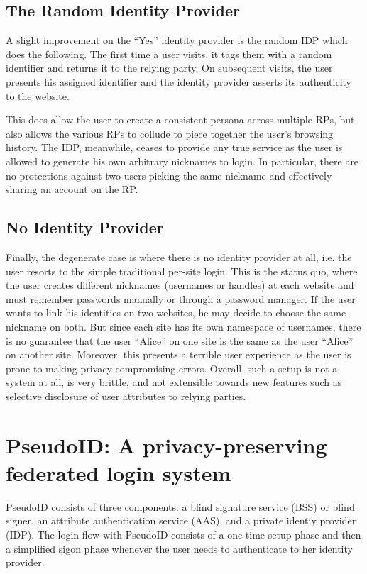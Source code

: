 \documentclass{llncs}
\begin{document}
\subsection{The Random Identity Provider}

A slight improvement on the ``Yes'' identity provider is the random IDP which
does the following. The first time a user visits, it tags them with a random
identifier and returns it to the relying party. On subsequent visits, the user
presents his assigned identifier and the identity provider asserts its
authenticity to the website.

This does allow the user to create a consistent persona across multiple RPs, but
also allows the various RPs to collude to piece together the user's browsing
history. The IDP, meanwhile, ceases to provide any true service as the user is
allowed to generate his own arbitrary nicknames to login. In particular, there
are no protections against two users picking the same nickname and effectively
sharing an account on the RP.

\subsection{No Identity Provider}

Finally, the degenerate case is where there is no identity provider at all, i.e.
the user resorts to the simple traditional per-site login. This is the status
quo, where the user creates different nicknames (usernames or handles) at each
website and must remember passwords manually or through a password manager. If
the user wants to link his identities on two websites, he may decide to choose
the same nickname on both. But since each site has its own namespace of
usernames, there is no guarantee that the user ``Alice'' on one site is the same
as the user ``Alice'' on another site. Moreover, this presents a terrible user
experience as the user is prone to making privacy-compromising errors. Overall,
such a setup is not a system at all, is very brittle, and not extensible towards
new features such as selective disclosure of user attributes to relying parties.

\section{PseudoID: A privacy-preserving federated login system}
\label{sec:pseudoid}

PseudoID consists of three components: a blind signature service (BSS) or blind
signer, an attribute authentication service (AAS), and a private identiy
provider (IDP). The login flow with PseudoID consists of a one-time setup phase
and then a simplified sigon phase whenever the user needs to authenticate to her
identity provider.
\end{document}

